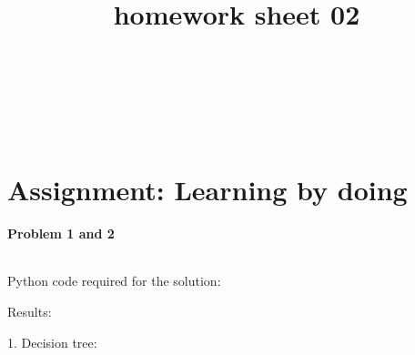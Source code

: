 \documentclass{article}
\title{homework sheet 02}
\author{
\name{Andre Seitz}\\
\imat{03622870}\\
\email{andre.seitz@mytum.de}
\And
\name{Linda Leidig} \\
\imat{03608416}\\
\email{linda.leidig@tum.de}
}
\begin{document}
\maketitle

\section{Assignment: Learning by doing}

\paragraph*{Problem 1 and 2}
$\;$ 

Python code required for the solution:





Results:

1. Decision tree:


\end{document}
